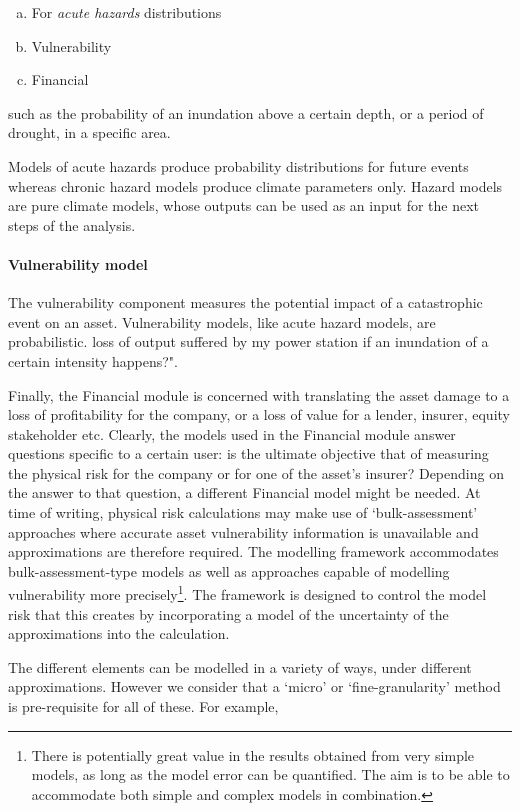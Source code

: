 \documentclass{article}
\begin{document}
\begin{enumerate}[a)]
	\item For \emph{acute hazards} distributions 
	\item Vulnerability
	\item Financial
\end{enumerate}
  such as the probability of an inundation above a certain depth, or a period of drought, in a specific area. 

Models of acute hazards produce probability distributions for future events whereas chronic hazard models produce climate parameters only. Hazard models are pure climate models, whose outputs can be used as an input for the next steps of the analysis. 

\paragraph{Vulnerability model}
The vulnerability component measures the potential impact of a catastrophic event on an asset. Vulnerability models, like acute hazard models, are probabilistic.  loss of output suffered by my power station if an inundation of a certain intensity happens?". 

Finally, the Financial module is concerned with translating the asset damage to a loss of profitability for the company, or a loss of value for a lender, insurer, equity stakeholder etc. Clearly, the models used in the Financial module answer questions specific to a certain user: is the ultimate objective that of measuring the physical risk for the company or for one of the asset's insurer? Depending on the answer to that question, a different Financial model might be needed. 
At time of writing, physical risk calculations may make use of `bulk-assessment' approaches where accurate asset vulnerability information is unavailable and approximations are therefore required. The modelling framework accommodates bulk-assessment-type models as well as approaches capable of modelling vulnerability more precisely\footnote{There is potentially great value in the results obtained from very simple models, as long as the model error can be quantified. The aim is to be able to accommodate both simple and complex models in combination.}. The framework is designed to control the model risk that this creates by incorporating a model of the uncertainty of the approximations into the calculation.

 The different elements can be modelled in a variety of ways, under different approximations. However we consider that a `micro' or `fine-granularity' method is pre-requisite for all of these. For example, 
\end{document}
